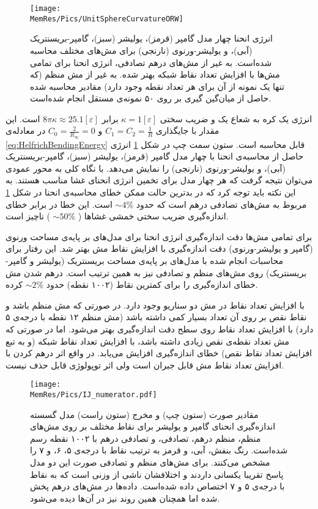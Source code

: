 \begin{figure}[htbp]
\begin{center}
\texttt{[image: \\MemRes/Pics/UnitSphereCurvatureORW]}
\caption{
انرژی انحنا چهار مدل گامپر (قرمز)، یولیشر (سبز)، گامپر-بریسنتریک (آبی)، و یولیشر-ورنوی (نارنجی) برای مش‌های مختلف محاسبه شده‌است. به غیر از مش‌های درهم تصادفی، انرژی انحنا برای تمامی مش‌ها با افزایش تعداد نقاط شبکه بهتر شده. به غیر از مش منظم (که تنها یک نمونه از آن برای هر تعداد نقطه وجود دارد) مقادیر محاسبه شده حاصل از میان‌گین گیری بر روی ۵۰ نمونه‌ی مستقل انجام شده‌است.
}
\label{fig:unitsphereBending}
\end{center}
\end{figure}

انرژی یک کره‌ به شعاع یک و ضریب سختی 
$\kappa=1[\varepsilon]$
برابر 
$8\pi\kappa\approx 25.1[\varepsilon]$
است. این مقدار با جایگذاری 
$C_1=C_2=\frac{1}{R}$
و
$C_0=\frac{2}{R_\infty}=0$
در معادله‌ی 
\ref{eq:HelfrichBendingEnergy}
قابل محاسبه‌ است. ستون سمت چپ در شکل 
\ref{fig:unitsphereBending}
انرژی حاصل از محاسبه‌ی انحنا با چهار مدل گامپر (قرمز)، یولیشر (سبز)، گامپر-بریسنتریک (آبی)، و یولیشر-ورنوی (نارنجی) را نمایش می‌دهد. با نگاه کلی به محور عمودی می‌توان نتیجه گرفت که هر چهار مدل برای تخمین انرژی انحنای غشا مناسب هستند. به این نکته باید توجه کرد که در بدترین حالت ممکن خطای محاسبه‌ی انحنا در شکل 
\ref{fig:unitsphereBending}
مربوط به مش‌های تصادفی درهم است که حدود
$\sim4\%$
است. این خطا در برابر خطای اندازه‌گیری ضریب سختی خمشی غشا‌ها (
$\sim50\%$
) ناچیز است.

برای تمامی مش‌ها دقت اندازه‌گیری انرژی انحنا برای مدل‌های بر پایه‌ی مساحت ورنوی (گامپر و یولیشر-ورنوی) دقت اندازه‌گیری با افزایش نقاط مش بهتر شد. این رفتار برای محاسبات انجام شده با مدل‌های بر پایه‌ی مساحت بریسنتریک (یولیشر و گامپر-بریسنتریک) روی مش‌های منظم و تصادفی نیز به همین ترتیب است. درهم شدن مش خطای اندازه‌‌گیری را برای کمترین نقاط (۱۰۰۲ نقطه) حدود 
$\sim2\%$
کرده. 

با افزایش تعداد نقاط در مش دو سناریو وجود دارد. در صورتی که مش‌ منظم باشد و نقاط نقص بر روی آن تعداد بسیار کمی داشته باشد (مش منظم ۱۲ نقطه با درجه‌ی ۵ دارد) با افزایش تعداد نقاط روی سطح دقت اندازه‌گیری بهتر می‌شود. اما در صورتی که مش تعداد نقطه‌ی نقص زیادی داشته باشد، با افزایش تعداد نقاط شبکه (و به تبع افزایش تعداد نقاط نقص) خطای اندازه‌گیری افزایش می‌یابد. در واقع اثر درهم کردن با افزایش تعداد نقاط مش قابل جبران است ولی اثر توپولوژی قابل حذف نیست.



\begin{figure}[htbp]
\begin{center}
\texttt{[image: \\MemRes/Pics/IJ\_numerator.pdf]}
\caption{
مقادیر صورت (ستون چپ) و مخرج (ستون راست) مدل گسسته اندازه‌گیری انحنای گامپر و یولیشر برای نقاط مختلف بر روی مش‌های منظم، منظم درهم، تصادفی، و تصادفی درهم با ۱۰۰۲ نقطه رسم شده‌است. رنگ بنفش، آبی، و قرمز به ترتیب  نقاط با درجه‌ی ۵، ۶، و ۷ را مشخص می‌کنند. برای مش‌های منظم و تصادفی صورت این دو مدل پاسخ تقریبا یکسانی داردند و اختلافشان ناشی از وزنی است که به نقاط با درجه‌ی ۵ و ۷ اختصاص داده شده‌است. داده‌ها در مش‌های درهم پخش شده اما همچنان همین روند نیز در آن‌ها دیده می‌شود.
}
\label{fig:unitsphereBendingScatter}
\end{center}
\end{figure}

